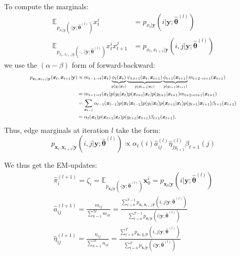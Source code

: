 \documentclass[9pt]{article}
\begin{document}
\begin{multicols}{2}
To compute the marginals:
\begin{align*}
\mathbb{E}_{p_{x_t | y}(\cdot | \mathbf{y}; \hat{\boldsymbol{\theta}}^{(l)})} x_t^i &= p_{x_t | \mathbf{y}}(i | \mathbf{y}; \hat{\boldsymbol{\theta}}^{(l)}) \\
\mathbb{E}_{p_{x_t, x_{t+1} | y}(\cdot, \cdot | \mathbf{y}; \hat{\boldsymbol{\theta}}^{(l)})} x_t^i x_{t+1}^j &= p_{x_t, x_{t+1} | \mathbf{y}}(i, j | \mathbf{y}; \hat{\boldsymbol{\theta}}^{(l)})
\end{align*}
we use the $(\alpha-\beta)$ form of forward-backward:
\[
\scalebox{0.72}{
\(
\begin{aligned}
p_{\boldsymbol{x}_t, \boldsymbol{x}_{t+1} | \mathbf{y}}(\boldsymbol{x}_t, \boldsymbol{x}_{t+1} | \mathbf{y}) 
&\propto m_{t-1 \to t}(\boldsymbol{x}_t) 
\underbrace{\phi_t(\boldsymbol{x}_t)}_{p(y_t | \boldsymbol{x}_t)} 
\underbrace{\psi_{t, t+1}(\boldsymbol{x}_t, \boldsymbol{x}_{t+1})}_{p(\boldsymbol{x}_{t+1} | \boldsymbol{x}_t)} 
\underbrace{\phi_{t+1}(\boldsymbol{x}_{t+1})}_{p(y_{t+1} | \boldsymbol{x}_{t+1})} 
m_{t+2 \to t+1}(\boldsymbol{x}_{t+1}) \\
&= m_{t-1 \to t}(\boldsymbol{x}_t) p(y_t | \boldsymbol{x}_t) p(\boldsymbol{x}_{t+1} | \boldsymbol{x}_t) p(y_{t+1} | \boldsymbol{x}_{t+1}) m_{t+2 \to t+1}(\boldsymbol{x}_{t+1}) \\
&= \sum_{\boldsymbol{x}_{t-1}} \alpha_{t-1}(\boldsymbol{x}_{t-1}) p(\boldsymbol{x}_t | \boldsymbol{x}_{t-1}) p(y_t | \boldsymbol{x}_t) p(\boldsymbol{x}_{t+1} | \boldsymbol{x}_t) p(y_{t+1} | \boldsymbol{x}_{t+1}) \beta_{t+1}(\boldsymbol{x}_{t+1}) \\
&= \alpha_t(\boldsymbol{x}_t) p(\boldsymbol{x}_{t+1} | \boldsymbol{x}_t) p(y_{t+1} | \boldsymbol{x}_{t+1}) \beta_{t+1}(\boldsymbol{x}_{t+1}).
\end{aligned}
\)
}
\]
Thus, edge marginals at iteration $l$ take the form:
\[
p_{\boldsymbol{x}_t, \boldsymbol{x}_{t+1} | \mathbf{y}}(i, j | \mathbf{y}; \hat{\boldsymbol{\theta}}^{(l)}) 
\propto \alpha_t(i) \hat{a}^{(l)}_{ij} \hat{\eta}^{(l)}_{j y_{t+1}} \beta_{t+1}(j)
\]

We thus get the EM-updates: 
\begin{align*}
\hat{\pi}_i^{(l+1)} = \zeta_i = \mathbb{E}_{p_{\boldsymbol{x}_0 | \mathbf{y}}(\cdot | \mathbf{y}; \hat{\boldsymbol{\theta}}^{(l)})} \boldsymbol{x}_0^i 
= p_{\boldsymbol{x}_0 | \mathbf{y}}(i | \mathbf{y}; \hat{\boldsymbol{\theta}}^{(l)}) \\
\hat{a}_{ij}^{(l+1)} = \frac{m_{ij}}{\sum_{k=1}^M m_{ik}} 
= \frac{\sum_{t=0}^{T-1} p_{\boldsymbol{x}_t, \boldsymbol{x}_{t+1} | \mathbf{y}}(i, j | \mathbf{y}; \hat{\boldsymbol{\theta}}^{(l)})}
{\sum_{t=0}^{T-1} p_{\boldsymbol{x}_t | \mathbf{y}}(i | \mathbf{y}; \hat{\boldsymbol{\theta}}^{(l)})} \\
\hat{\eta}_{ij}^{(l+1)} = \frac{n_{ij}}{\sum_{k=1}^M n_{ik}} 
= \frac{\sum_{t=0}^{T} p_{\boldsymbol{x}_t, y_t | \mathbf{y}}(i, j | \mathbf{y}; \hat{\boldsymbol{\theta}}^{(l)})}
{\sum_{t=0}^{T} p_{\boldsymbol{x}_t | \mathbf{y}}(i | \mathbf{y}; \hat{\boldsymbol{\theta}}^{(l)})}
\end{align*}


\end{multicols}
\end{document}
